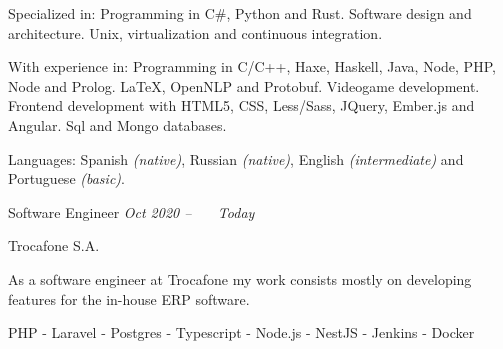 \documentclass[10pt,a4paper]{article}
\begin{document}
\spacedhrule{0.8em}{-0.4em} %






\inlineheadsection
  { Specialized in: }
  { Programming in C\#, Python and Rust. Software design and architecture. Unix, virtualization and continuous integration.}

\inlineheadsection
  { With experience in: }
  { Programming in C/C++, Haxe, Haskell, Java, Node, PHP, Node and Prolog. \LaTeX, OpenNLP and Protobuf. Videogame development. Frontend development with HTML5, CSS, Less/Sass, JQuery, Ember.js and Angular. Sql and Mongo databases. }

  \vspace{0.5em}
\inlineheadsection
  { Languages: }
  { Spanish \emph{(native)}, Russian \emph{(native)}, English \emph{(intermediate)} and Portuguese \emph{(basic)}.}


\spacedhrule{1.9em}{-0.4em} %



\newcommand{\jobdetail}[2]{

    \small
    \leftskip=10pt
    \rightskip=60pt
    #1
    
    \vspace{5pt}
    \footnotesize
    #2

}


\vspace{0.2em}
\headedsection
    { Software Engineer }
    { \textit{Oct 2020 -- \ \ \ Today\ \ \ \  } }{
    \headedsubsection
        { Trocafone S.A. }
        {}
        {
            \jobdetail{
                As a software engineer at Trocafone my work consists mostly on
                developing features for the in-house ERP software.
            }{
                PHP - Laravel - Postgres - Typescript - Node.js - NestJS - Jenkins - Docker
            }
        }
}
\end{document}
